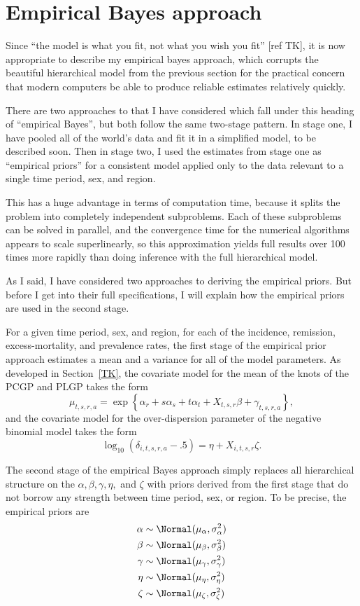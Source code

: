 \section{Empirical Bayes approach}
Since ``the model is what you fit, not what you wish you fit'' [ref TK], it is
now appropriate to describe my empirical bayes approach, which
corrupts the beautiful hierarchical model from the previous section
for the practical concern that modern computers be able to produce
reliable estimates relatively quickly.

There are two approaches to that I have considered which fall under
this heading of ``empirical Bayes'', but both follow the same
two-stage pattern.  In stage one, I have pooled all of the world's
data and fit it in a simplified model, to be described soon.  Then in
stage two, I used the estimates from stage one as ``empirical priors''
for a consistent model applied only to the data relevant to a single
time period, sex, and region.

This has a huge advantage in terms of computation time, because it
splits the problem into completely independent subproblems.  Each of
these subproblems can be solved in parallel, and the convergence time
for the numerical algorithms appears to scale superlinearly, so this
approximation yields full results over 100 times more rapidly than
doing inference with the full hierarchical model.

As I said, I have considered two approaches to deriving the empirical
priors.  But before I get into their full specifications, I will
explain how the empirical priors are used in the second stage.

For a given time period, sex, and region, for each of the incidence,
remission, excess-mortality, and prevalence rates, the
first stage of the empirical prior approach estimates a mean and a
variance for all of the model parameters.  As developed in
Section~\ref{TK}, the covariate model for the
mean of the knots of the PCGP and PLGP takes the form
\[
\mu_{t,s,r,a} = \exp\left\{\alpha_r + s\alpha_s + t\alpha_t +
X_{t,s,r}\beta + \gamma_{t,s,r,a}\right\},
\]
and the covariate model for the over-dispersion parameter of the negative binomial model takes the
form
\[
\log_{10}(\delta_{i,t,s,r,a}-.5) = \eta + X_{i,t,s,r}\zeta.
\]

The second stage of the empirical Bayes approach simply replaces all
hierarchical structure on the $\alpha, \beta, \gamma, \eta,$ and
$\zeta$ with priors derived from the first stage that do not borrow
any strength between time period, sex, or region.  To be precise, the
empirical priors are
\begin{align*}
\alpha &\sim \Normal(\mu_\alpha, \sigma_\alpha^2)\\
\beta &\sim \Normal(\mu_\beta, \sigma_\beta^2)\\
\gamma &\sim \Normal(\mu_\gamma, \sigma_\gamma^2)\\
\eta &\sim \Normal(\mu_\eta, \sigma_\eta^2)\\
\zeta &\sim \Normal(\mu_\zeta, \sigma_\zeta^2)
\end{align*}

